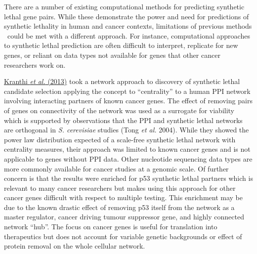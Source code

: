 There are a number of existing computational methods for predicting synthetic lethal gene pairs. While these demonstrate the power and need for predictions of synthetic lethality in human and cancer contexts, limitations of previous methods \ could be met with a different approach. For instance, computational approaches to synthetic lethal prediction are often difficult to interpret, replicate for new genes, or reliant on data types not available for genes that other cancer researchers work on.  

\hyperlink{ENREF59}{Kranthi}\hyperlink{ENREF59}{\textit{ et al.}}\hyperlink{ENREF59}{ (2013)} took a network approach to discovery of synthetic lethal candidate selection applying the concept to ``centrality'' to a human PPI network involving interacting partners of known cancer genes. The effect of removing pairs of genes on connectivity of the network was used as a surrogate for viability which is supported by observations that the PPI and synthetic lethal networks are orthogonal in \textit{S. cerevisiae} studies (Tong\textit{ et al.} 2004). While they showed the power law distribution expected of a scale-free synthetic lethal network with centrality measures, their approach was limited to known cancer genes and is not applicable to genes without PPI data. Other nucleotide sequencing data types are more commonly available for cancer studies at a genomic scale. Of further concern is that the results were enriched for p53 synthetic lethal partners which is relevant to many cancer researchers but makes using this approach for other cancer genes difficult with respect to multiple testing. This enrichment may be due to the known drastic effect of removing p53 itself from the network as a master regulator, cancer driving tumour suppressor gene, and highly connected network ``hub''. The focus on cancer genes is useful for translation into therapeutics but does not account for variable genetic backgrounds or effect of protein removal on the whole cellular network.  

